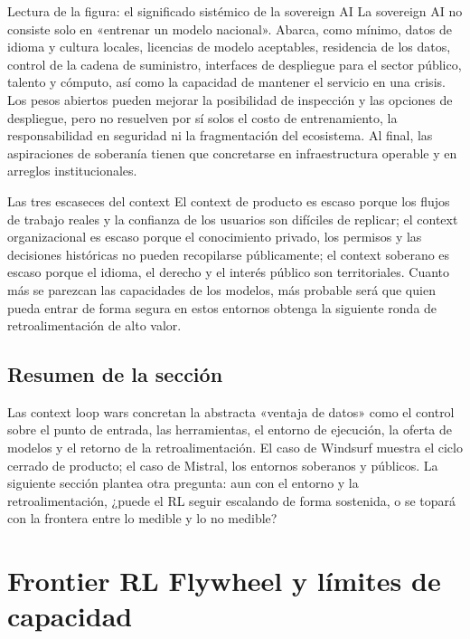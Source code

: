 \documentclass[a4paper]{article}
\begin{document}
\begin{knowledgebox}{Lectura de la figura: el significado sistémico de la sovereign AI}
La sovereign AI no consiste solo en «entrenar un modelo nacional». Abarca, como mínimo, datos de idioma y cultura locales, licencias de modelo aceptables, residencia de los datos, control de la cadena de suministro, interfaces de despliegue para el sector público, talento y cómputo, así como la capacidad de mantener el servicio en una crisis. Los pesos abiertos pueden mejorar la posibilidad de inspección y las opciones de despliegue, pero no resuelven por sí solos el costo de entrenamiento, la responsabilidad en seguridad ni la fragmentación del ecosistema. Al final, las aspiraciones de soberanía tienen que concretarse en infraestructura operable y en arreglos institucionales.
\end{knowledgebox}

\begin{importantbox}{Las tres escaseces del context}
El context de producto es escaso porque los flujos de trabajo reales y la confianza de los usuarios son difíciles de replicar; el context organizacional es escaso porque el conocimiento privado, los permisos y las decisiones históricas no pueden recopilarse públicamente; el context soberano es escaso porque el idioma, el derecho y el interés público son territoriales. Cuanto más se parezcan las capacidades de los modelos, más probable será que quien pueda entrar de forma segura en estos entornos obtenga la siguiente ronda de retroalimentación de alto valor.
\end{importantbox}

\subsection{Resumen de la sección}

Las context loop wars concretan la abstracta «ventaja de datos» como el control sobre el punto de entrada, las herramientas, el entorno de ejecución, la oferta de modelos y el retorno de la retroalimentación. El caso de Windsurf muestra el ciclo cerrado de producto; el caso de Mistral, los entornos soberanos y públicos. La siguiente sección plantea otra pregunta: aun con el entorno y la retroalimentación, ¿puede el RL seguir escalando de forma sostenida, o se topará con la frontera entre lo medible y lo no medible?
\section{Frontier RL Flywheel y límites de capacidad}
\end{document}
